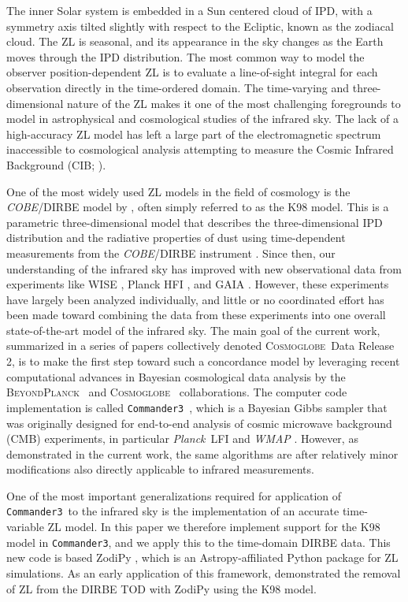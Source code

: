 \documentclass[twocolumn]{aa}
\def\commanderthree{\texttt{Commander3}}
\def\Planck{\textit{Planck}}
\def\WMAP{\textit{WMAP}}
\newcommand{\BP}{\textsc{BeyondPlanck}}
\newcommand{\cosmoglobe}{\textsc{Cosmoglobe}}
\begin{document}
The inner Solar system is embedded in a Sun centered cloud of IPD,
with a symmetry axis tilted slightly with respect to the Ecliptic,
known as the zodiacal cloud. The ZL is seasonal, and its appearance in
the sky changes as the Earth moves through the IPD distribution. The
most common way to model the observer position-dependent ZL is to
evaluate a line-of-sight integral for each observation directly in the
time-ordered domain. The time-varying and three-dimensional nature of
the ZL makes it one of the most challenging foregrounds to model in
astrophysical and cosmological studies of the infrared sky. The lack
of a high-accuracy ZL model has left a large part of the
electromagnetic spectrum inaccessible to cosmological analysis
attempting to measure the Cosmic Infrared Background (CIB;
\citealp{partridge1967,hauser1998,hauser:2001}).

One of the most widely used ZL models in the field of cosmology is the
\textit{COBE}/DIRBE model by \citet{Kelsall1998}, often simply
referred to as the K98 model. This is a parametric three-dimensional
model that describes the three-dimensional IPD distribution and the
radiative properties of dust using time-dependent measurements from
the \textit{COBE}/DIRBE instrument \citep{hauser1998}. Since then, our
understanding of the infrared sky has improved with new observational
data from experiments like WISE \citep{wright:2010}, Planck HFI
\citep{planck2016-l03}, and GAIA \citep{gaia:2016}. However, these
experiments have largely been analyzed individually, and little or no
coordinated effort has been made toward combining the data from these
experiments into one overall state-of-the-art model of the infrared
sky. The main goal of the current work, summarized in a series of
papers collectively denoted \cosmoglobe\ Data Release 2, is to make
the first step toward such a concordance model by leveraging recent
computational advances in Bayesian cosmological data analysis by the
\BP\ \citep[][and references therein]{BP2023,Galloway2023} and
\cosmoglobe\ \citep{Watts2023} collaborations. The computer code
implementation is called \commanderthree\ \citep{Galloway2023}, which
is a Bayesian Gibbs sampler that was originally designed for
end-to-end analysis of cosmic microwave background (CMB) experiments,
in particular \Planck\ LFI \citep{planck2016-l02} and \WMAP
\citep{bennett2012}. However, as demonstrated in the current work, the
same algorithms are after relatively minor modifications also directly
applicable to infrared measurements.

One of the most important generalizations required for application of
\commanderthree\ to the infrared sky is the implementation of an
accurate time-variable ZL model. In this paper we therefore implement
support for the K98 model in \commanderthree, and we apply this to the
time-domain DIRBE data. This new code is based ZodiPy \citep{San2024},
which is an Astropy-affiliated Python package for ZL simulations. As
an early application of this framework, \cite{San2022} demonstrated
the removal of ZL from the DIRBE TOD with ZodiPy using the K98 model.
\end{document}
